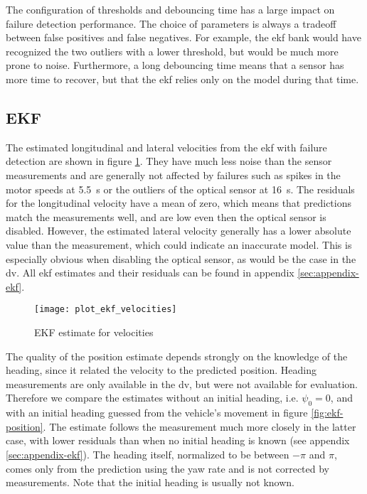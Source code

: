 The configuration of thresholds and debouncing time has a large impact on failure detection performance. The choice of parameters is always a tradeoff between false positives and false negatives. For example, the \gls{ekf} bank would have recognized the two outliers with a lower threshold, but would be much more prone to noise. Furthermore, a long debouncing time means that a sensor has more time to recover, but that the \gls{ekf} relies only on the model during that time.


\subsection{EKF}
The estimated longitudinal and lateral velocities from the \gls{ekf} with failure detection are shown in figure \ref{fig:ekf-velocities}. They have much less noise than the sensor measurements and are generally not affected by failures such as spikes in the motor speeds at \SI{5.5}{\second} or the outliers of the optical sensor at \SI{16}{\second}. The residuals for the longitudinal velocity have a mean of zero, which means that predictions match the measurements well, and are low even then the optical sensor is disabled. However, the estimated lateral velocity generally has a lower absolute value than the measurement, which could indicate an inaccurate model. This is especially obvious when disabling the optical sensor, as would be the case in the \gls{dv}. All \gls{ekf} estimates and their residuals can be found in appendix \ref{sec:appendix-ekf}.

\begin{figure}[t]
	\centering
	\texttt{[image: plot\_ekf\_velocities]}%
	\caption{EKF estimate for velocities}
	\label{fig:ekf-velocities}
\end{figure}

The quality of the position estimate depends strongly on the knowledge of the heading, since it related the velocity to the predicted position. Heading measurements are only available in the \gls{dv}, but were not available for evaluation. Therefore we compare the estimates without an initial heading, i.e. $\psi_0 = 0$, and with an initial heading guessed from the vehicle's movement in figure \ref{fig:ekf-position}. The estimate follows the measurement much more closely in the latter case, with lower residuals than when no initial heading is known (see appendix \ref{sec:appendix-ekf}). The heading itself, normalized to be between $-\pi$ and $\pi$, comes only from the prediction using the yaw rate and is not corrected by measurements. Note that the initial heading is usually not known.

